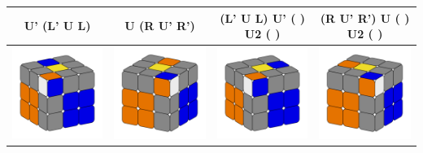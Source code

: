 \documentclass[12pt, a3paper]{article}
\newcommand{\scale}{1}
\begin{document}
\begin{center}
\begin{longtable}{c|c||c|c}
	U' (L' U L) & U (R U' R') & (L' U L) U' ( ) U2 ( ) & (R U' R') U ( ) U2 ( ) \\
	\hline
	\hline
	\includegraphics[scale=\scale]{3_left} & \includegraphics[scale=\scale]{3_right}  &  \includegraphics[scale=\scale]{4_left} & \includegraphics[scale=\scale]{4_right} \\

\end{longtable}
\end{center}
\end{document}
